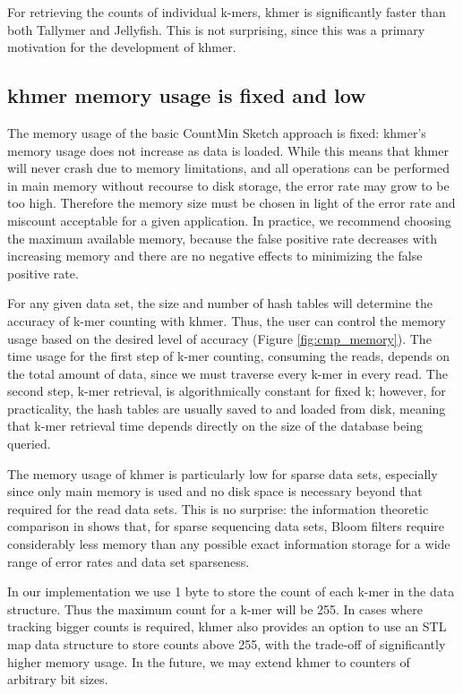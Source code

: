 \documentclass[10pt]{article}
\begin{document}
For retrieving the counts of individual k-mers, khmer is significantly
faster than both Tallymer and Jellyfish.  This is not surprising,
since this was a primary motivation for the development of khmer.

\subsection*{khmer memory usage is fixed and low}

The memory usage of the basic CountMin Sketch approach is fixed:
khmer's memory usage does not increase as data is loaded. While this
means that khmer will never crash due to memory limitations, and all
operations can be performed in main memory without recourse to disk
storage, the error rate may grow to be too high.  Therefore the memory
size must be chosen in light of the error rate and miscount acceptable
for a given application.  In practice, we recommend choosing the
maximum available memory, because the false positive rate decreases
with increasing memory and there are no negative effects to minimizing
the false positive rate.

For any given data set, the size and number of hash tables will
determine the accuracy of k-mer counting with khmer.  Thus, the user
can control the memory usage based on the desired level of accuracy
(Figure \ref{fig:cmp_memory}). The time usage for the first step of
k-mer counting, consuming the reads, depends on the total amount of
data, since we must traverse every k-mer in every read.  The second
step, k-mer retrieval, is algorithmically constant for fixed k;
however, for practicality, the hash tables are usually saved to and
loaded from disk, meaning that k-mer retrieval time depends directly
on the size of the database being queried.

The memory usage of khmer is particularly low for sparse data sets,
especially since only main memory is used and no disk space is
necessary beyond that required for the read data sets.  This is no
surprise: the information theoretic comparison in \cite{Pell2012}
shows that, for sparse sequencing data sets, Bloom filters require
considerably less memory than any possible exact information storage
for a wide range of error rates and data set sparseness.

In our implementation we use 1 byte to store the count of each k-mer
in the data structure. Thus the maximum count for a k-mer will be 255.
In cases where tracking bigger counts is required, khmer also provides
an option to use an STL map data structure to store counts above 255,
with the trade-off of significantly higher memory usage.  In the
future, we may extend khmer to counters of arbitrary bit sizes.
\end{document}
